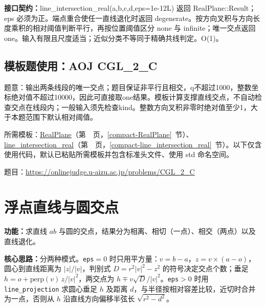 {\sloppy{}\noindent\textbf{接口契约：}line\_intersection\_real(a,b,c,d,eps=1e-12L) 返回 RealPlane::Result；eps 必须为正。端点重合使任一直线退化时返回 degenerate。按方向叉积与方向长度乘积的相对阈值判断平行，再按位置阈值区分 none 与 infinite；唯一交点返回 one。输入有限且尺度适当；近似分类不等同于精确共线判定。O(1)。\par}



\Needspace{358pt}

\subsection*{模板题使用：AOJ CGL\_2\_C}

\label{usage-example-183}

题意：输出两条线段的唯一交点；题目保证非平行且相交，q不超过1000，整数坐标绝对值不超过10000，因此可直接取one结果。模板计算支撑直线交点，不自动检查交点在线段内；一般输入须先检查kind。整数方向叉积非零时绝对值至少1，大于本题范围下默认相对阈值。

所需模板：\hyperref[compact-RealPlane]{RealPlane}（第~\pageref{compact-RealPlane}~页，\ref{compact-RealPlane}~节）、\hyperref[compact-line_intersection_real]{line\_\allowbreak{}intersection\_\allowbreak{}real}（第~\pageref{compact-line_intersection_real}~页，\ref{compact-line_intersection_real}~节）。以下仅含使用代码，默认已粘贴所需模板并包含标准头文件、使用 std 命名空间。

题目：\url{https://onlinejudge.u-aizu.ac.jp/problems/CGL_2_C}



\newpage

\section{浮点直线与圆交点}\label{compact-line_circle_intersections}

\noindent\textbf{功能：}\allowbreak 求直线 $ab$ 与圆的交点，结果分为相离、相切（一点）、相交（两点）以及直线退化。

\textbf{核心思路：}\allowbreak 分两种模式。\texttt{eps}$=0$ 时只用平方量：$v=b-a$，$z=v\times(a-o)$，圆心到直线距离为 $|z|/|v|$，判别式 $D=r^2|v|^2-z^2$ 的符号决定交点个数；垂足 $h=o+\mathrm{perp}(v)\,z/|v|^2$，两交点为 $h\mp v\sqrt D/|v|^2$。\texttt{eps}$>0$ 时用 \texttt{line\_projection} 求圆心垂足 $h$ 及距离 $d$，与半径按相对容差比较，近切时合并为一点，否则从 $h$ 沿直线方向偏移半弦长 $\sqrt{r^2-d^2}$。


